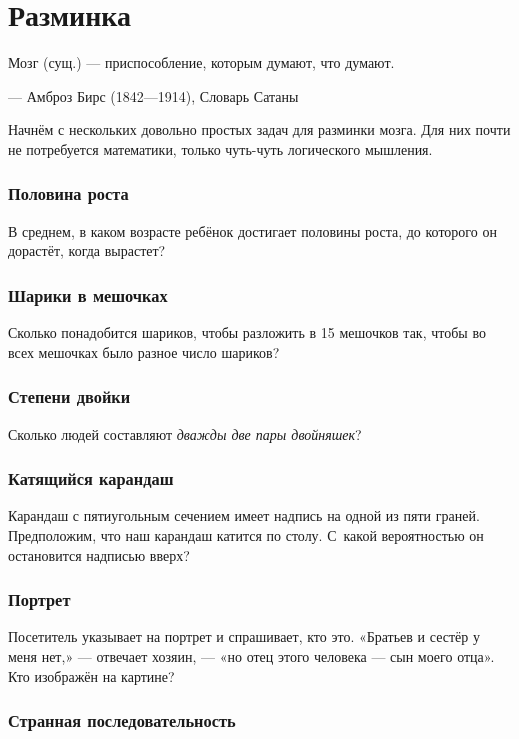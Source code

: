 \chapter{Разминка}


\setlength{\epigraphwidth}{.80\textwidth}
\epigraph{Мозг (сущ.) --- приспособление, которым думают, что думают.}{--- Амброз Бирс (1842---1914), Словарь Сатаны}

Начнём с нескольких довольно простых задач для разминки мозга.
Для них почти не потребуется математики, только чуть-чуть логического мышления.

\subsection*{Половина роста}

В среднем, в каком возрасте ребёнок достигает половины роста, до которого он дорастёт, когда вырастет?

\subsection*{Шарики в мешочках}

Сколько понадобится шариков, чтобы разложить в 15 мешочков так,
чтобы во всех мешочках было разное число шариков?

\subsection*{Степени двойки}

Сколько людей составляют \emph{дважды две пары двойняшек}?

\subsection*{Катящийся карандаш}

Карандаш с пятиугольным сечением имеет надпись на одной из пяти граней.
Предположим, что наш карандаш катится по столу.
С~какой вероятностью он остановится надписью вверх?

\subsection*{Портрет}

Посетитель указывает на портрет и спрашивает, кто это. 
«Братьев и сестёр у меня нет,» --- отвечает хозяин, --- «но отец этого человека --- сын моего отца».
Кто изображён на картине?

\subsection*{Странная последовательность}

